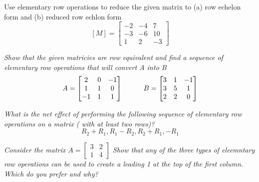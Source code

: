 \documentclass[11pt,letterpaper,boxed]{hmcpset}
\begin{document}

\begin{problem}[2.2.14]
Use elementary row operations to reduce the given matrix to (a) row echelon form and (b) reduced row echlon form
$$[M]=\begin{bmatrix}
-2 & -4 & 7 \\ -3 & -6 & 10 \\ 1 & 2 & -3
\end{bmatrix} 
$$
\end{problem}



\pagebreak

\begin{problem}[2.2.18]
\textit{Show that the given matricies are row equivalent and find a sequence of elementary row operations that will convert A into B }
$$ 
A = \begin{bmatrix}
	2&0&-1\\
	1&1&0\\
	-1&1&1
\end{bmatrix}
\indent \indent  
B=\begin{bmatrix}
	3&1&-1\\
	3&5&1\\
	2&2&0
\end{bmatrix}
$$
\end{problem}



\pagebreak

\begin{problem}[2.2.20]
\textit{What is the net effect of performing the following sequence of elementary row operations on a matrix ( with at least two rows)? }
$$ R_2+ R_1, R_1-R_2, R_2+R_1, -R_1 $$
\end{problem}



\pagebreak

\begin{problem}[2.2.22]
\textit{ Consider the matrix $ A= \begin{bmatrix}
3&2\\1&4
\end{bmatrix}$ Show that any of the three types of eleemntary row operations can be used to create a leading 1 at the top of the first column. Which do you prefer and why? }
\end{problem}
\end{document}
